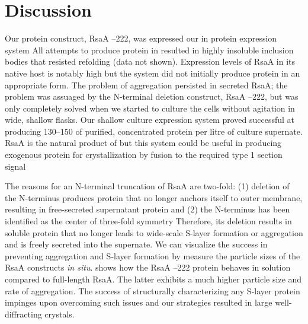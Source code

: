 \section{Discussion}\label{sec:crystal-discussion}
Our protein construct, RsaA --222, was expressed our in \caulobacter protein expression system All attempts to produce protein in \ecoli{} resulted in highly insoluble inclusion bodies that resisted refolding (data not shown). Expression levels of RsaA in its native host is notably high but the system did not initially produce protein in an appropriate form. The problem of aggregation persisted in \caulobacter secreted RsaA; the problem was assuaged by the N-terminal deletion construct, RsaA --222, but was only completely solved when we started to culture the cells without agitation in wide, shallow flasks. Our shallow culture expression system proved successful at producing 130--150 \milligram  of purified, concentrated protein per litre of culture supernate. RsaA is the natural product of \caulobacter but this system could be useful in producing exogenous protein for crystallization by fusion to the required type 1 section signal

The reasons for an N-terminal truncation of RsaA are two-fold: (1) deletion of the
N-terminus produces protein that no longer anchors itself to outer membrane,
resulting in free-secreted supernatant protein and (2) the N-terminus has been
identified as the center of three-fold symmetry Therefore,
its deletion results in soluble protein that no longer leads to wide-scale
\ac{S-layer} formation or aggregation and is freely secreted into the
supernate. We can visualize the success in preventing aggregation and \ac{S-layer} formation by measure the particle sizes of the RsaA constructs \textit{in situ}.  shows how the RsaA --222 protein behaves in solution compared to full-length RsaA. The latter exhibits a much higher particle size and rate of aggregation. The success of structurally characterizing any S-layer protein impinges upon overcoming such issues and our strategies resulted in large well-diffracting crystals.

